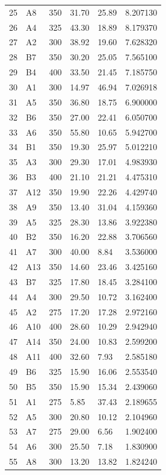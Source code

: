 \begin{longtable}{C{0.07\textwidth}C{0.08\textwidth}C{0.11\textwidth}C{0.18\textwidth}C{0.18\textwidth}C{0.18\textwidth}}
25 & A8 & 350 & 31.70 & 25.89 & 8.207130 \\
26 & A4 & 325 & 43.30 & 18.89 & 8.179370 \\
27 & A2 & 300 & 38.92 & 19.60 & 7.628320 \\
28 & B7 & 350 & 30.20 & 25.05 & 7.565100 \\
29 & B4 & 400 & 33.50 & 21.45 & 7.185750 \\
30 & A1 & 300 & 14.97 & 46.94 & 7.026918 \\
31 & A5 & 350 & 36.80 & 18.75 & 6.900000 \\
32 & B6 & 350 & 27.00 & 22.41 & 6.050700 \\
33 & A6 & 350 & 55.80 & 10.65 & 5.942700 \\
34 & B1 & 350 & 19.30 & 25.97 & 5.012210 \\
35 & A3 & 300 & 29.30 & 17.01 & 4.983930 \\
36 & B3 & 400 & 21.10 & 21.21 & 4.475310 \\
37 & A12 & 350 & 19.90 & 22.26 & 4.429740 \\
38 & A9 & 350 & 13.40 & 31.04 & 4.159360 \\
39 & A5 & 325 & 28.30 & 13.86 & 3.922380 \\
40 & B2 & 350 & 16.20 & 22.88 & 3.706560 \\
41 & A7 & 300 & 40.00 & 8.84 & 3.536000 \\
42 & A13 & 350 & 14.60 & 23.46 & 3.425160 \\
43 & B7 & 325 & 17.80 & 18.45 & 3.284100 \\
44 & A4 & 300 & 29.50 & 10.72 & 3.162400 \\
45 & A2 & 275 & 17.20 & 17.28 & 2.972160 \\
46 & A10 & 400 & 28.60 & 10.29 & 2.942940 \\
47 & A14 & 350 & 24.00 & 10.83 & 2.599200 \\
48 & A11 & 400 & 32.60 & 7.93 & 2.585180 \\
49 & B6 & 325 & 15.90 & 16.06 & 2.553540 \\
50 & B5 & 350 & 15.90 & 15.34 & 2.439060 \\
51 & A1 & 275 & 5.85 & 37.43 & 2.189655 \\
52 & A5 & 300 & 20.80 & 10.12 & 2.104960 \\
53 & A7 & 275 & 29.00 & 6.56 & 1.902400 \\
54 & A6 & 300 & 25.50 & 7.18 & 1.830900 \\
55 & A8 & 300 & 13.20 & 13.82 & 1.824240 \\

\end{longtable}
